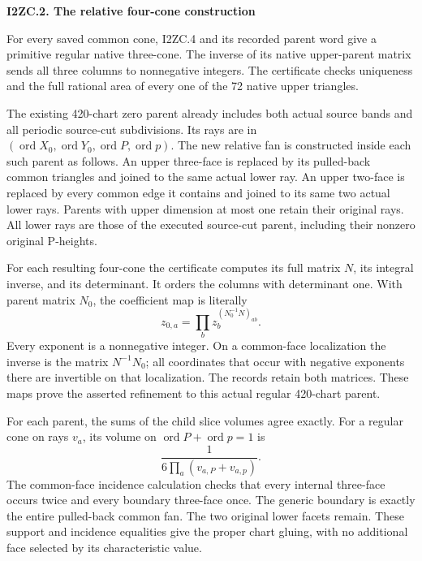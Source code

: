 \par

\medskip\noindent\textbf{I2ZC.2. The relative four-cone construction}

\par\nobreak

For every saved common cone, I2ZC.4 and its recorded parent word
give a primitive regular native three-cone. The inverse of its
native upper-parent matrix sends all three columns to nonnegative
integers. The certificate checks uniqueness and the full rational
area of every one of the 72 native upper triangles.

The existing 420-chart zero parent already includes both actual
source bands and all periodic source-cut subdivisions. Its rays
are in \((\operatorname{ord}X_0,\operatorname{ord}Y_0,
\operatorname{ord}P,\operatorname{ord}p)\). The new relative
fan is constructed inside each such parent as follows. An upper
three-face is replaced by its pulled-back common triangles and
joined to the same actual lower ray. An upper two-face is replaced
by every common edge it contains and joined to its same two actual
lower rays. Parents with upper dimension at most one retain their
original rays. All lower rays are those of the executed source-cut
parent, including their nonzero original P-heights.

For each resulting four-cone the certificate computes its full
matrix \(N\), its integral inverse, and its determinant. It orders
the columns with determinant one. With parent matrix \(N_0\),
the coefficient map is literally
\[
 z_{0,a}=\prod_b z_b^{(N_0^{-1}N)_{ab}}.
 \tag{I2ZC.5}
\]
Every exponent is a nonnegative integer. On a common-face
localization the inverse is the matrix \(N^{-1}N_0\); all
coordinates that occur with negative exponents there are
invertible on that localization. The records retain both matrices.
These maps prove the asserted refinement to this actual regular
420-chart parent.

For each parent, the sums of the child slice volumes agree exactly.
For a regular cone on rays \(v_a\), its volume on
\(\operatorname{ord}P+\operatorname{ord}p=1\) is
\[
 \frac1{6\prod_a(v_{a,P}+v_{a,p})}.
 \tag{I2ZC.6}
\]
The common-face incidence calculation checks that every internal
three-face occurs twice and every boundary three-face once. The
generic boundary is exactly the entire pulled-back common fan.
The two original lower facets remain. These support and incidence
equalities give the proper chart gluing, with no additional face
selected by its characteristic value.


